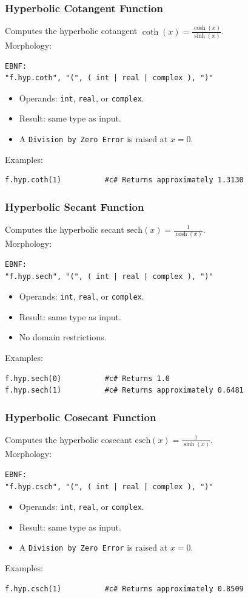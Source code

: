 \subsubsection{Hyperbolic Cotangent Function}
Computes the hyperbolic cotangent $\coth(x) = \frac{\cosh(x)}{\sinh(x)}$. \\
Morphology:
\begin{verbatim}
EBNF:
"f.hyp.coth", "(", ( int | real | complex ), ")"
\end{verbatim}
\begin{itemize}
\item Operands: \texttt{int}, \texttt{real}, or \texttt{complex}.
\item Result: same type as input.
\item A \texttt{Division by Zero Error} is raised at $x = 0$.
\end{itemize}
Examples:
\begin{verbatim}
f.hyp.coth(1)          #c# Returns approximately 1.3130
\end{verbatim}

\subsubsection{Hyperbolic Secant Function}
Computes the hyperbolic secant $\text{sech}(x) = \frac{1}{\cosh(x)}$. \\
Morphology:
\begin{verbatim}
EBNF:
"f.hyp.sech", "(", ( int | real | complex ), ")"
\end{verbatim}
\begin{itemize}
\item Operands: \texttt{int}, \texttt{real}, or \texttt{complex}.
\item Result: same type as input.
\item No domain restrictions.
\end{itemize}
Examples:
\begin{verbatim}
f.hyp.sech(0)          #c# Returns 1.0
f.hyp.sech(1)          #c# Returns approximately 0.6481
\end{verbatim}

\subsubsection{Hyperbolic Cosecant Function}
Computes the hyperbolic cosecant $\text{csch}(x) = \frac{1}{\sinh(x)}$. \\
Morphology:
\begin{verbatim}
EBNF:
"f.hyp.csch", "(", ( int | real | complex ), ")"
\end{verbatim}
\begin{itemize}
\item Operands: \texttt{int}, \texttt{real}, or \texttt{complex}.
\item Result: same type as input.
\item A \texttt{Division by Zero Error} is raised at $x = 0$.
\end{itemize}
Examples:
\begin{verbatim}
f.hyp.csch(1)          #c# Returns approximately 0.8509
\end{verbatim}

